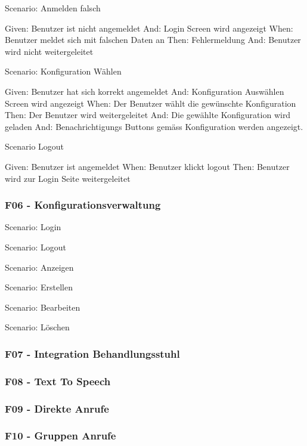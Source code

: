         Scenario: Anmelden falsch

        Given: Benutzer ist nicht angemeldet
        And:   Login Screen wird angezeigt
        When:  Benutzer meldet sich mit falschen Daten an
        Then:  Fehlermeldung
        And: Benutzer wird nicht weitergeleitet


        Scenario: Konfiguration Wählen

        Given: Benutzer hat sich korrekt angemeldet
        And:   Konfiguration Auswählen Screen wird angezeigt
        When:  Der Benutzer wählt die gewünschte Konfiguration
        Then:  Der Benutzer wird weitergeleitet
        And:   Die gewählte Konfiguration wird geladen
        And:   Benachrichtigungs Buttons gemäss Konfiguration werden angezeigt.


        Scenario Logout

        Given: Benutzer ist angemeldet
        When:  Benutzer klickt logout
        Then: Benutzer wird zur Login Seite weitergeleitet


    \subsubsection*{F06 - Konfigurationsverwaltung}

        Scenario: Login

        Scenario: Logout

        Scenario: Anzeigen

        Scenario: Erstellen

        Scenario: Bearbeiten

        Scenario: Löschen





    \subsubsection*{F07 - Integration Behandlungsstuhl}
    \subsubsection*{F08 - Text To Speech}
    \subsubsection*{F09 - Direkte Anrufe}
    \subsubsection*{F10 - Gruppen Anrufe}


